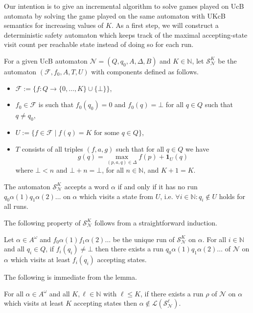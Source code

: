 \documentclass[runningheads,a4paper,draft]{llncs}
\newcommand{\indicator}[2]{\mathbf{1}_{#1}(#2)}
\newcommand{\calF}{\mathcal{F}}
\newcommand{\calN}{\mathcal{N}}
\newcommand{\calS}{\mathcal{S}}
\newcommand{\lang}[1]{\mathcal{L}({#1})}
\begin{document}
Our intention is to give an incremental algorithm to solve games played on UcB
automata by solving the game played on the same automaton with UKcB semantics
for increasing values of $K$. As a first step, we will construct a
deterministic
safety automaton which keeps track of the maximal accepting-state visit
count per reachable state instead of doing so for each run.
\begin{definition}
  For a given UcB automaton $\calN = (Q,q_0,A,\Delta,B)$ and $K \in
  \mathbb{N}$, let $\calS^K_\calN$ be the automaton $(\calF,f_0,A,T,U)$
  with components defined as follows.
  \begin{itemize}
    \item $\calF := \{f : Q \to \{0,\dots,K\} \cup
      \{\bot\}\}$,
    \item $f_0 \in \calF$ is such that $f_0(q_0) = 0$ and $f_0(q) =
      \bot$ for all $q \in Q$ such that $q \neq q_0$,
    \item $U := \{ f \in \calF \mid f(q) = K \text{ for
      some } q \in Q \}$,
    \item $T$ consists of all triples $(f,a,g)$ such that for all $q \in Q$ we
      have
      \[
        g(q) = \max_{(p,a,q) \in \Delta}
        f(p) + \indicator{U}{q}
      \]
      where $\bot < n$ and $\bot + n = \bot$, for all $n \in \mathbb{N}$, and
      $K + 1 = K$.
  \end{itemize}
  The automaton $\calS^K_\calN$ accepts a word $\alpha$ if and only if it has no
  run $q_0 \alpha(1) q_1 \alpha(2) \dots$ on $\alpha$ which visits a
  state from $U$, i.e. $\forall i \in \mathbb{N} : q_i \not\in U$ holds for all
  runs.
\end{definition}

The following property of $\calS^K_\calN$ follows from a
straightforward induction.
\begin{lemma}\label{lem:runs-visits}
  Let $\alpha \in A^\omega$ and $f_0 \alpha(1) f_1 \alpha(2) \dots$ be the
  unique run of $\calS^K_\calN$ on $\alpha$. For all $i \in \mathbb{N}$ and
  all $q_i \in Q$, if $f_i(q_i) \neq \bot$ then there exists a run $q_0
  \alpha(1) q_1 \alpha(2) \dots$ of $\calN$ on $\alpha$ which visits at least
  $f_i(q_i)$ accepting states.
\end{lemma}
%
The following is immediate from the lemma.
\begin{corollary}\label{cor:safe-approx}
  For all $\alpha \in A^\omega$ and all $K,\ell \in \mathbb{N}$ with $\ell
  \leq K$, if there exists a run $\rho$ of $\calN$ on $\alpha$ which visits
  at least $K$ accepting states then $\alpha \not\in \lang{\calS^\ell_\calN}$.
\end{corollary}
\end{document}
